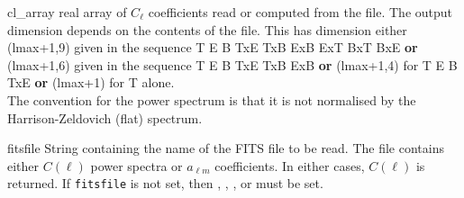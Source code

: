 \begin{qualifiers}
  \begin{qulist}{} %
    \item[cl\_array] %
      real array of $C_\ell$ coefficients read or computed from the
      file. The output dimension depends on the contents of the file. 
	This has dimension either (lmax+1,9) given in the sequence T E B
      TxE TxB ExB ExT BxT BxE {\bf or}
       (lmax+1,6) given in the sequence T E B
      TxE TxB ExB {\bf or} (lmax+1,4) for T E B TxE {\bf or} (lmax+1) for T
    alone. \\
     The convention for the power spectrum is that it is not
      normalised by the Harrison-Zeldovich (flat) spectrum.
%
    \item[fitsfile] %
    String containing the name of the FITS file to be read. The
    file contains either $C(\ell)$ power spectra or $a_{\ell m}$ coefficients. In either
    cases, $C(\ell)$ is returned. If {\tt fitsfile} is not set, then
,
,
,
 or
must be set.
  \end{qulist}
\end{qualifiers}

